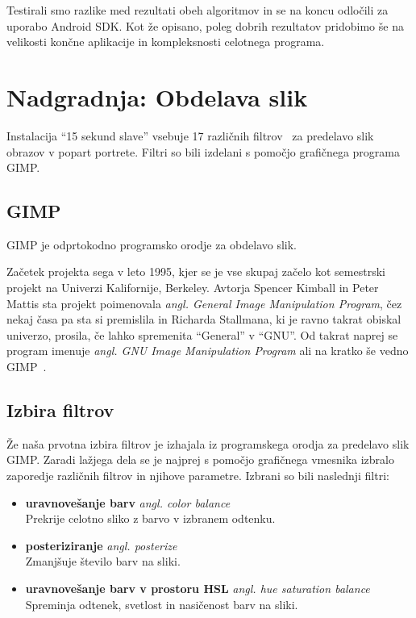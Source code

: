 \documentclass[a4paper, 12pt]{book}
\begin{document}
Testirali smo razlike med rezultati obeh algoritmov in se na koncu odločili za
uporabo Android SDK. Kot že opisano, poleg dobrih rezultatov pridobimo še na
velikosti končne aplikacije in kompleksnosti celotnega programa.


\chapter{Nadgradnja: Obdelava slik}
\label{ch:obdelavaSlik}
Instalacija ``15 sekund slave'' vsebuje 17 različnih
filtrov~\cite[Poglavje~5]{thesisSamoJuvan} za predelavo slik obrazov v
popart portrete. Filtri so bili izdelani s pomočjo grafičnega programa GIMP.


\section{GIMP}
\label{sec:obdelavaSlikGIMP}
GIMP je odprtokodno programsko orodje za obdelavo slik.


Začetek projekta sega v leto 1995, kjer se je vse skupaj začelo kot
semestrski projekt na Univerzi Kalifornije, Berkeley. Avtorja Spencer Kimball
in Peter Mattis sta projekt poimenovala \textit{angl. General Image
Manipulation Program}, čez nekaj časa pa sta si premislila in Richarda
Stallmana, ki je ravno takrat obiskal univerzo, prosila, če lahko spremenita
``General'' v ``GNU''. Od takrat naprej se program imenuje
\textit{angl. GNU Image Manipulation Program} ali na kratko še vedno
GIMP~\cite{wiki:GIMP}.


\section{Izbira filtrov}
Že naša prvotna izbira filtrov je izhajala iz programskega orodja za predelavo
slik GIMP. Zaradi lažjega dela se je najprej s pomočjo grafičnega vmesnika
izbralo zaporedje različnih filtrov in njihove parametre. Izbrani so bili
naslednji filtri:
\begin{itemize}
    \item \textbf{uravnovešanje barv} \textit{angl. color balance} \hfill \\
        Prekrije celotno sliko z barvo v izbranem odtenku.
    \item \textbf{posteriziranje} \textit{angl. posterize} \hfill \\
        Zmanjšuje število barv na sliki.
    \item \textbf{uravnovešanje barv v prostoru HSL} \textit{angl. hue saturation balance} \hfill \\
        Spreminja odtenek, svetlost in nasičenost barv na sliki.
\end{itemize}
\end{document}
